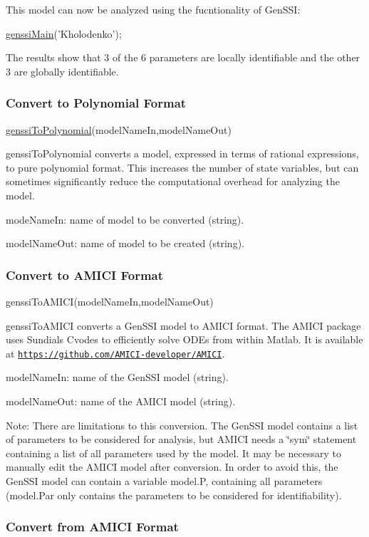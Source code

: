 This model can now be analyzed using the fucntionality of Gen\+S\+SI\+:


\begin{DoxyCode}
\hyperlink{genssi_main_8m_aac78e2620e69e2ecf610a2526a32c7fb}{genssiMain}(\textcolor{stringliteral}{'Kholodenko'}); 
\end{DoxyCode}


The results show that 3 of the 6 parameters are locally identifiable and the other 3 are globally identifiable.\hypertarget{def_simu_poly}{}\subsubsection{Convert to Polynomial Format}\label{def_simu_poly}

\begin{DoxyCode}
\hyperlink{genssi_to_polynomial_8m_acef0ff085917e1375d0fc2b6feed0722}{genssiToPolynomial}(modelNameIn,modelNameOut) 
\end{DoxyCode}


genssi\+To\+Polynomial converts a model, expressed in terms of rational expressions, to pure polynomial format. This increases the number of state variables, but can sometimes significantly reduce the computational overhead for analyzing the model.

mode\+Name\+In\+: name of model to be converted (string).

model\+Name\+Out\+: name of model to be created (string).\hypertarget{def_simu_toamici}{}\subsubsection{Convert to A\+M\+I\+C\+I Format}\label{def_simu_toamici}

\begin{DoxyCode}
genssiToAMICI(modelNameIn,modelNameOut) 
\end{DoxyCode}


genssi\+To\+A\+M\+I\+CI converts a Gen\+S\+SI model to A\+M\+I\+CI format. The A\+M\+I\+CI package uses Sundials Cvodes to efficiently solve O\+D\+Es from within Matlab. It is available at \href{https://github.com/AMICI-developer/AMICI}{\tt https\+://github.\+com/\+A\+M\+I\+C\+I-\/developer/\+A\+M\+I\+CI}.

model\+Name\+In\+: name of the Gen\+S\+SI model (string).

model\+Name\+Out\+: name of the A\+M\+I\+CI model (string).

Note\+: There are limitations to this conversion. The Gen\+S\+SI model contains a list of parameters to be considered for analysis, but A\+M\+I\+CI needs a \char`\"{}sym\char`\"{} statement containing a list of all parameters used by the model. It may be necessary to manually edit the A\+M\+I\+CI model after conversion. In order to avoid this, the Gen\+S\+SI model can contain a variable model.\+P, containing all parameters (model.\+Par only contains the parameters to be considered for identifiability).\hypertarget{def_simu_fromamici}{}\subsubsection{Convert from A\+M\+I\+C\+I Format}\label{def_simu_fromamici}

